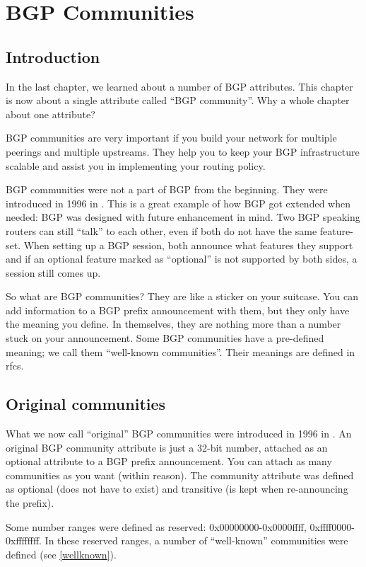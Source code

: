 \chapter{BGP Communities}
\label{ch:BGP Communities}
\section{Introduction}
In the last chapter, we learned about a number of BGP attributes. This chapter is now about a single attribute called ``BGP community''. Why a whole chapter about one attribute?

BGP communities are very important if you build your network for multiple peerings and multiple upstreams. They help you to keep your BGP infrastructure scalable and assist you in implementing your routing policy.

BGP communities were not a part of BGP from the beginning. They were introduced in 1996 in \cite{rfc1997}. This is a great example of how BGP got extended when needed: BGP was designed with future enhancement in mind. Two BGP speaking routers can still ``talk'' to each other, even if both do not have the same feature-set. When setting up a BGP session, both announce what features they support and if an optional feature marked as ``optional'' is not supported by both sides, a session still comes up.

So what are BGP communities? They are like a sticker on your suitcase. You can add information to a BGP prefix announcement with them, but they only have the meaning you define. In themselves, they are nothing more than a number stuck on your announcement. Some BGP communities have a pre-defined meaning; we call them ``well-known communities''. Their meanings are defined in \glspl{rfc}.

\section{Original communities}
What we now call ``original'' BGP communities were introduced in 1996 in \cite{rfc1997}. An original BGP community attribute is just a 32-bit number, attached as an optional attribute to a BGP prefix announcement. You can attach as many communities as you want (within reason). The community attribute was defined as optional (does not have to exist) and transitive (is kept when re-announcing the prefix).

Some number ranges were defined as reserved: 0x00000000-0x0000ffff, 0xffff0000-0xffffffff. In these reserved ranges, a number of ``well-known'' communities were defined (see \ref{wellknown}).

